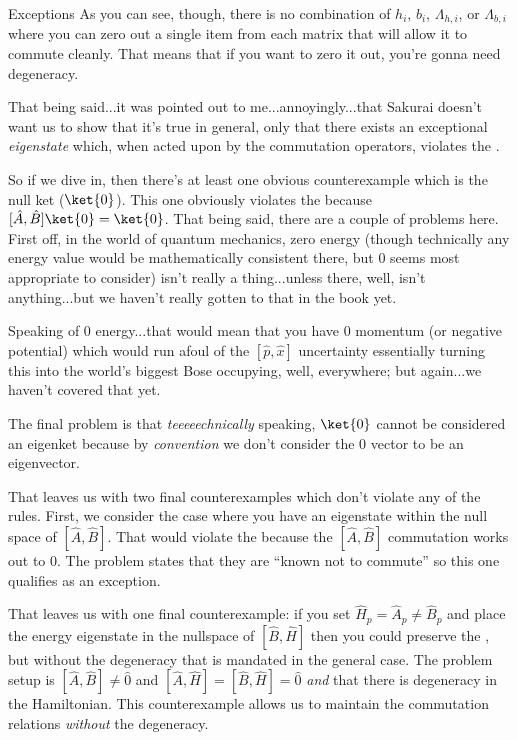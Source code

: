 \begin{answer}
\begin{answerpart}{Exceptions}
    As you can see, though, there is no combination of $h_i$, $b_i$,
    $\Lambda_{h,i}$, or $\Lambda_{b,i}$ where you can zero out a
    single item from each matrix that will allow it to commute
    cleanly.  That means that if you want to zero it out, you're gonna
    need degeneracy.

    That being said...it was pointed out to me...annoyingly...that
    Sakurai doesn't want us to show that it's true in general, only
    that there exists an exceptional \emph{eigenstate} which, when
    acted upon by the commutation operators, violates the \ctrois{}.

    So if we dive in, then there's at least one obvious counterexample
    which is the null ket ($\ket{0}$).  This one obviously violates
    the \ctrois{} because $[\hat{A}, \hat{B}]\ket{0} = \ket{0}$.  That
    being said, there are a couple of problems here.  First off, in
    the world of quantum mechanics, zero energy (though technically
    any energy value would be mathematically consistent there, but 0
    seems most appropriate to consider) isn't really a thing...unless
    there, well, isn't anything...but we haven't really gotten to that
    in the book yet.

    Speaking of $0$ energy...that would mean that you have $0$
    momentum (or negative potential) which would run afoul of the
    $[\hat{p}, \hat{x}]$ uncertainty essentially turning this into the
    world's biggest Bose occupying, well, everywhere; but again...we
    haven't covered that yet.

    The final problem is that \emph{teeeeechnically} speaking,
    $\ket{0}$ cannot be considered an eigenket because by
    \emph{convention} we don't consider the $0$ vector to be an
    eigenvector.

    That leaves us with two final counterexamples which don't violate
    any of the rules.  First, we consider the case where you have an
    eigenstate within the null space of $[\hat{A}, \hat{B}]$.  That
    would violate the \ctrois{} because the $[\hat{A}, \hat{B}]$
    commutation works out to $0$.  The problem states that they are
    ``known not to commute'' so this one qualifies as an exception.

    That leaves us with one final counterexample: if you set
    $\hat{H}_p = \hat{A}_p \ne \hat{B}_p$ and place the energy
    eigenstate in the nullspace of $[\hat{B}, \hat{H}]$ then you could
    preserve the \ctrois{}, but without the degeneracy that is
    mandated in the general case.  The problem setup is $[\hat{A},
      \hat{B}] \ne \hat{0}$ and $[\hat{A}, \hat{H}] = [\hat{B},
      \hat{H}] = \hat{0}$ \emph{and} that there is degeneracy in the
    Hamiltonian.  This counterexample allows us to maintain the
    commutation relations \emph{without} the degeneracy.
  \end{answerpart}


\end{answer}
